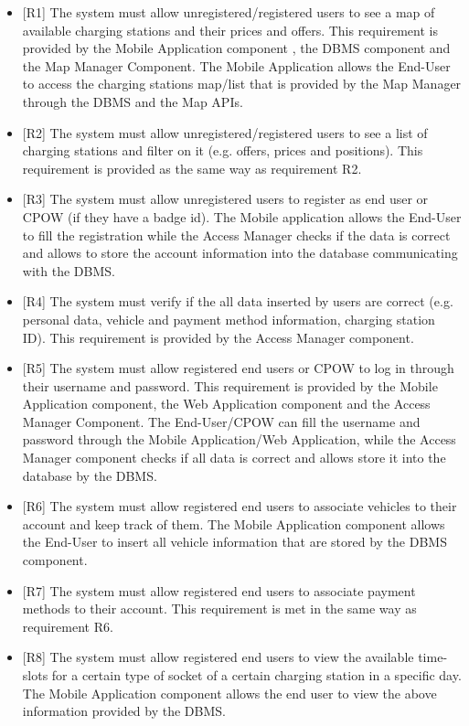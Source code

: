 \documentclass[a4paper]{report}
\begin{document}
\begin{itemize}
    \item{[R1]} \label{R1} The system must allow unregistered/registered users to see a map of available charging stations and their prices and offers. This requirement is provided by the Mobile Application component , the DBMS component and the Map Manager Component. The Mobile Application allows the End-User to access the charging stations map/list that is provided by the Map Manager through the DBMS and the Map APIs.
    \item{[R2]} \label{R2} The system must allow unregistered/registered users to see a list of charging stations and filter on it (e.g. offers, prices and positions). This requirement is provided as the same way as requirement R2.
    \item{[R3]} \label{R3} The system must allow unregistered users to register as end user or CPOW (if they have a badge id). The Mobile application allows the End-User to fill the registration while the Access Manager checks if the data is correct and allows to store the account information into the database communicating with the DBMS.
    \item{[R4]} \label{R4} The system must verify if the all data inserted by users are correct (e.g. personal data, vehicle and payment method information, charging station ID). This requirement is provided by the Access Manager component.
    \item{[R5]} \label{R5} The system must allow registered end users or CPOW to log in through their username and password. This requirement is provided by the Mobile Application component, the Web Application component and the Access Manager Component. The End-User/CPOW can fill the username and password through the Mobile Application/Web Application, while the Access Manager component checks if all data is correct and allows store it into the database by the DBMS.
    \item{[R6]} \label{R6} The system must allow registered end users to associate vehicles to their account and keep track of them. The Mobile Application component allows the End-User to insert all vehicle information that are stored by the DBMS component.
    \item{[R7]} \label{R7} The system must allow registered end users to associate payment methods to their account. This requirement is met in the same way as requirement R6.
    \item{[R8]} \label{R8} The system must allow registered end users to view the available time-slots for a certain type of socket of a certain charging station in a specific day. The Mobile Application component allows the end user to view the above information provided by the DBMS.

\end{itemize}
\end{document}
